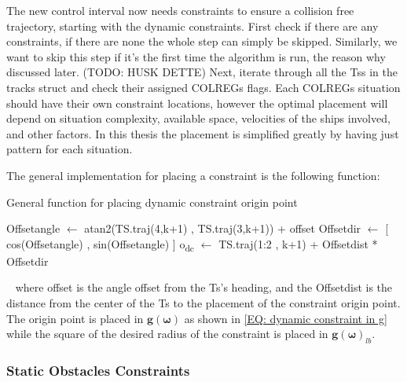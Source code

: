 The new control interval now needs constraints to ensure a collision free trajectory, starting with the dynamic constraints.
First check if there are any constraints, if there are none the whole step can simply be skipped. Similarly, we want to skip
this step if it's the first time the algorithm is run, the reason why discussed later. (TODO: HUSK DETTE)
Next, iterate through all the \gls{Ts}s in the tracks struct and check their assigned COLREGs flags.
Each COLREGs situation should have their own constraint locations, however the optimal placement
will depend on situation complexity, available space, velocities of the ships involved, and other factors. In
this thesis the placement is simplified greatly by having just pattern for each situation.

The general implementation for placing a constraint is the following function:
\begin{algorithm}[ht]
    \caption{General function for placing dynamic constraint origin point}
    \label{ALG: dynamic constraint origin}
    \begin{algorithmic}
        \State Offsetangle $\gets$ atan2(TS.traj(4,k+1) , TS.traj(3,k+1)) + offset
        \State Offsetdir $\gets$ [ cos(Offsetangle) , sin(Offsetangle) ]
        \State o\textsubscript{dc} $\gets$ TS.traj(1:2 , k+1) + Offsetdist * Offsetdir
    \end{algorithmic}
\end{algorithm}
 \newline
where offset is the angle offset from the \gls{Ts}'s heading, and the Offsetdist is the distance from the center of the
\gls{Ts} to the placement of the constraint origin point. The origin point is placed in $\textbf{g}(\bm{\omega})$
as shown in \eqref{EQ: dynamic constraint in g} while the square of the desired radius of the constraint is placed in
$\textbf{g}(\bm{\omega})_{lb}$.



\subsubsection*{Static Obstacles Constraints} \label{Chap: Method Static Obs}



